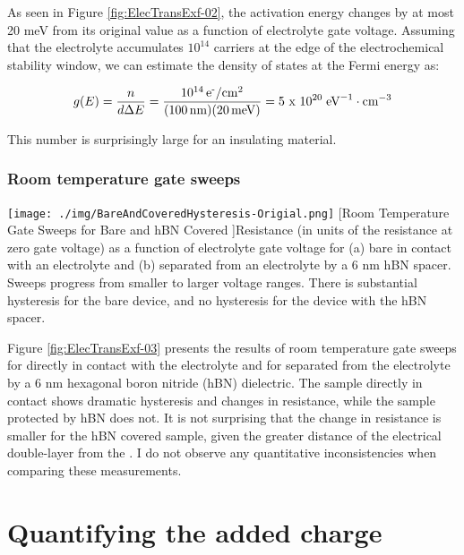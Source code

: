 As seen in Figure \ref{fig:ElecTransExf-02}, the activation energy changes by at most 20 meV from its original value as a function of electrolyte gate voltage. Assuming that the electrolyte accumulates $10^{14}$ \percmsq{} carriers at the edge of the electrochemical stability window, we can estimate the density of states at the Fermi energy as:

\begin{equation}
g(E) = \frac{n}{d \Delta E} = \frac{10^{14}\, \text{e\textsuperscript{-}/cm\textsuperscript{2}}}{(100\, \text{nm})(20\, \text{meV})} = \text{5 x 10}^{20}\; \text{eV}^{-1} \cdot \text{cm}^{-3}
\end{equation}

This number is surprisingly large for an insulating material.

\subsubsection{Room temperature gate sweeps}

\begin{centering}
\texttt{[image: ./img/BareAndCoveredHysteresis-Origial.png]}
  \captionsetup{width=0.75\textwidth}
  [Room Temperature Gate Sweeps for Bare and hBN Covered \rucl]{Resistance (in units of the resistance at zero gate voltage) as a function of electrolyte gate voltage for (a) bare \rucl in contact with an electrolyte and (b) \rucl separated from an electrolyte by a 6 nm hBN spacer. Sweeps progress from smaller to larger voltage ranges. There is substantial hysteresis for the bare device, and no hysteresis for the device with the hBN spacer.} 
  \label{fig:ElecTransExf-03}
\end{centering}

Figure \ref{fig:ElecTransExf-03} presents the results of room temperature gate sweeps for \rucl directly in contact with the electrolyte and for \rucl separated from the electrolyte by a 6 nm hexagonal boron nitride (hBN) dielectric. The sample directly in contact shows dramatic hysteresis and changes in resistance, while the sample protected by hBN does not. It is not surprising that the change in resistance is smaller for the hBN covered sample, given the greater distance of the electrical double-layer from the \ruclnospace . I do not observe any quantitative inconsistencies when comparing these measurements.

\section{Quantifying the added charge}


